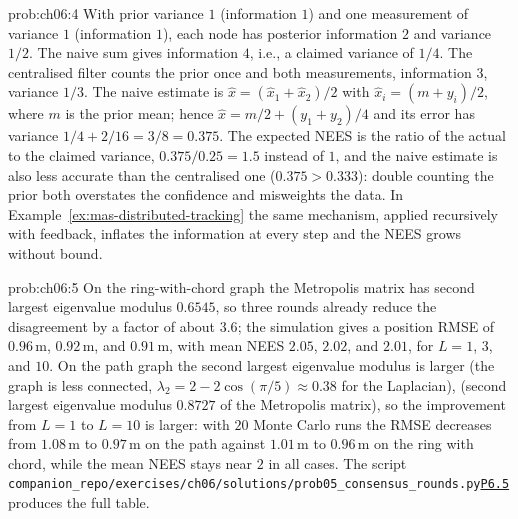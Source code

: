 \documentclass[graybox,envcountchap]{style/SNmono}
\newcommand{\repopath}[1]{\texttt{#1}}
\providecommand{\DIFadd}[1]{{\protect\color{blue} #1}} %
\providecommand{\DIFdel}[1]{{\protect\color{red} #1}} %
\DeclareRobustCommand{\RtwoDel}[1]{{\color{red}%
  \renewcommand{\DIFadd}[1]{##1}\renewcommand{\DIFdel}[1]{##1}%
  #1}}
\DeclareRobustCommand{\RtwoAdd}[1]{{\color{blue}#1}}
\DeclareRobustCommand{\codeentry}[1]{\hyperref[code:#1]{\texttt{#1}}}
\begin{document}
\begin{sol}{prob:ch06:4}
With prior variance $1$ (information $1$) and one measurement of variance $1$ (information $1$), each node has posterior information $2$ and variance $1/2$. The naive sum gives information $4$, i.e., a claimed variance of $1/4$. The centralised filter counts the prior once and both measurements, information $3$, variance $1/3$. The naive estimate is $\widehat{x}=(\widehat{x}_1+\widehat{x}_2)/2$ with $\widehat{x}_i=(m+y_i)/2$, where $m$ is the prior mean; hence $\widehat{x}=m/2+(y_1+y_2)/4$ and its error has variance $1/4+2/16=3/8=0.375$. The expected NEES is the ratio of the actual to the claimed variance, $0.375/0.25=1.5$ instead of $1$, and the naive estimate is also less accurate than the centralised one ($0.375>0.333$): double counting the prior both overstates the confidence and misweights the data. In Example~\ref{ex:mas-distributed-tracking} the same mechanism, applied recursively with feedback, inflates the information at every step and the NEES grows without bound.
\end{sol}

\begin{sol}{prob:ch06:5}
On the ring-with-chord graph the Metropolis matrix has second largest eigenvalue modulus $0.6545$, so three rounds already reduce the disagreement by a factor of about $3.6$; the simulation gives a position RMSE of $0.96$\,m, $0.92$\,m, and $0.91$\,m, with mean NEES $2.05$, $2.02$, and $2.01$, for $L=1$, $3$, and $10$. On the path graph the second largest eigenvalue modulus is larger (the graph is less connected, $\lambda_2=2-2\cos(\pi/5)\approx0.38$ for the Laplacian), (second largest eigenvalue modulus $0.8727$ of the Metropolis matrix), so the improvement from $L=1$ to $L=10$ is larger: with $20$ Monte Carlo runs the RMSE decreases from $1.08$\,m to $0.97$\,m on the path against $1.01$\,m to $0.96$\,m on the ring with chord, while the mean NEES stays near $2$ in all cases. The script \RtwoDel{\repopath{companion\_\allowbreak repo/\allowbreak exercises/\allowbreak ch06/\allowbreak solutions/\allowbreak prob05\_\allowbreak consensus\_\allowbreak rounds.py}}\RtwoAdd{\codeentry{P6.5}} produces the full table.
\end{sol}
\end{document}
